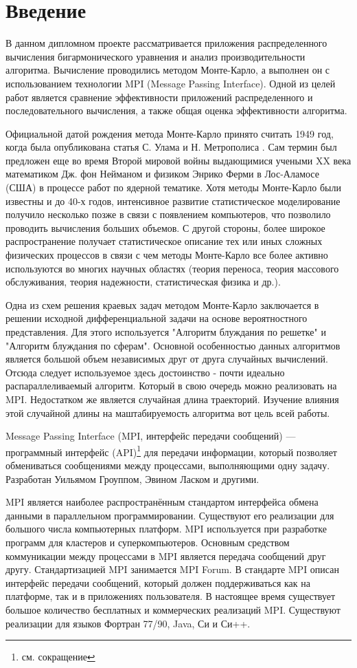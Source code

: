 \chapter*{Введение}
В данном дипломном проекте рассматривается приложения распределенного вычисления бигармонического уравнения и анализ производительности алгоритма. Вычисление проводились методом Монте-Карло, а выполнен он с использованием технологии MPI (Message Passing Interface). Одной из целей работ является сравнение эффективности приложений распределенного и последовательного вычисления, а также общая оценка эффективности алгоритма.

Официальной датой рождения метода Монте-Карло принято считать 1949 год, когда была опубликована статья С. Улама и Н. Метрополиса \cite{int:fist} . Сам термин был предложен еще во время Второй мировой войны выдающимися учеными XX века математиком Дж. фон Нейманом и физиком Энрико Ферми в Лос-Аламосе (США) в процессе работ по ядерной тематике. Хотя методы Монте-Карло были известны и до 40-х годов, интенсивное развитие статистическое моделирование получило несколько позже в связи с появлением компьютеров, что позволило проводить вычисления больших объемов. С другой стороны, более широкое распространение получает статистическое описание тех или иных сложных физических процессов в связи с чем методы Монте-Карло все более активно используются во многих научных областях (теория переноса, теория массового обслуживания, теория надежности, статистическая физика и др.).

Одна из схем решения краевых задач методом Монте-Карло заключается в решении исходной дифференциальной задачи на основе вероятностного представления. Для этого используется "Алгоритм блуждания по решетке" и "Алгоритм блуждания по сферам". Основной особенностью данных алгоритмов является большой объем независимых друг от друга случайных вычислений.
Отсюда следует используемое здесь достоинство -  почти идеально распараллеливаемый алгоритм. Который в свою очередь можно реализовать на MPI.
Недостатком же является случайная длина траекторий. Изучение влияния этой случайной длины на маштабируемость алгоритма вот цель всей работы.

Message Passing Interface (MPI, интерфейс передачи сообщений) — программный интерфейс (API)\footnote{см. сокращение} для передачи информации, который позволяет обмениваться сообщениями между процессами, выполняющими одну задачу. Разработан Уильямом Гроуппом, Эвином Ласком и другими.

MPI является наиболее распространённым стандартом интерфейса обмена данными в параллельном программировании. Существуют его реализации для большого числа компьютерных платформ. MPI используется при разработке программ для кластеров и суперкомпьютеров. Основным средством коммуникации между процессами в MPI является передача сообщений друг другу. Стандартизацией MPI занимается MPI Forum. В стандарте MPI описан интерфейс передачи сообщений, который должен поддерживаться как на платформе, так и в приложениях пользователя. В настоящее время существует большое количество бесплатных и коммерческих реализаций MPI. Существуют реализации для языков Фортран 77/90, Java, Си и Си++.

